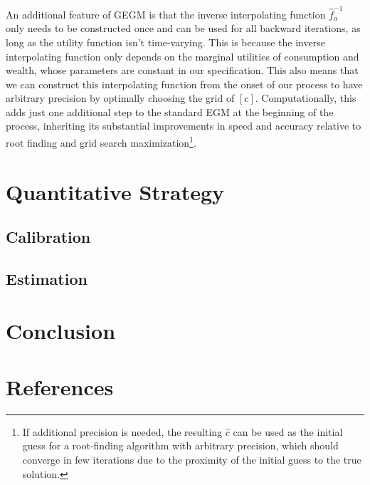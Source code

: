 \documentclass{article}
\newcommand{\cNrm}{c}
\newcommand{\cMat}{[\mathrm{\cNrm}]}
\begin{document}
An additional feature of GEGM is that the inverse interpolating function $\hat{f}_{a}^{ -1}$ only needs to be constructed once and can be used for all backward iterations, as long as the utility function isn't time-varying. This is because the inverse interpolating function only depends on the marginal utilities of consumption and wealth, whose parameters are constant in our specification. This also means that we can construct this interpolating function from the onset of our process to have arbitrary precision by optimally choosing the grid of $\cMat$. Computationally, this adds just one additional step to the standard EGM at the beginning of the process, inheriting its substantial improvements in speed and accuracy relative to root finding and grid search maximization\footnote{If additional precision is needed, the resulting $\hat{\cNrm}$ can be used as the initial guess for a root-finding algorithm with arbitrary precision, which should converge in few iterations due to the proximity of the initial guess to the true solution.}.

\section{Quantitative Strategy}\label{Quantitative Strategy}

\subsection{Calibration}\label{Calibration}

\subsection{Estimation}\label{Estimation}

\section{Conclusion}\label{Conclusion}

\section{References}\label{References}

\cite{Carroll_2000}
\cite{Carroll_1998}
\cite{Michaillat_2021}
\cite{Auclert_2021}
\cite{Mian_2020}
\cite{Kaplan_2018}
\cite{Auclert_2020}
\cite{Cagetti_2003}





\end{document}
